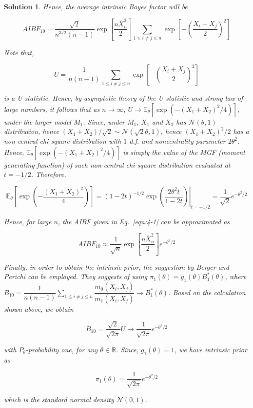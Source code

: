 \documentclass[12pt]{article}
\theoremstyle{problemstyle}
\newtheorem*{solution*}{Solution}
\newcommand{\E}{\mathbb{E}}
\newcommand{\normal}{\mathcal{N}}
\newcommand{\R}{\mathbb{R}}
\begin{document}
\begin{solution*}
    Hence, the average intrinsic Bayes factor will be

    \begin{equation}
        AIBF_{10} = \dfrac{\sqrt{2}}{n^{3/2}(n-1)} \exp\left[ \dfrac{n\overline{X}_n^2}{2} \right] \sum_{1 \leq i \neq j \leq n} \exp\left[ -\left(\dfrac{X_i + X_j}{2}\right)^2 \right]
        \label{eqn:4-1}        
    \end{equation}

    Note that, 

    $$
    U = \dfrac{1}{n(n-1)} \sum_{1 \leq i \neq j \leq n} \exp\left[ -\left(\dfrac{X_i + X_j}{2}\right)^2 \right]
    $$

    is a U-statistic. Hence, by asymptotic theory of the U-statistic and strong law of large numbers, it follows that as $n \rightarrow \infty$, $U \rightarrow \E_{\theta}\left[ \exp\left( -(X_1 + X_2)^2/4 \right) \right]$, under the larger model $M_1$. Since, under $M_1$, $X_1$ and $X_2$ has $\normal(\theta, 1)$ distribution, hence $(X_1 + X_2)/\sqrt{2} \sim \normal(\sqrt{2}\theta, 1)$, hence $(X_1 + X_2)^2/2$ has a non-central chi-square distribution with $1$ d.f. and noncentrality parameter $2\theta^2$. Hence, $\E_{\theta}\left[ \exp\left( -(X_1 + X_2)^2/4 \right) \right]$ is simply the value of the MGF (moment generating function) of such non-central chi-square distribution evaluated at $t = -1/2$. Therefore,

    $$
    \E_{\theta}\left[ \exp\left( -\dfrac{(X_1 + X_2)^2}{4} \right) \right] = \left. (1-2t)^{-1/2} \exp\left( \dfrac{2\theta^2 t}{1-2t} \right) \right\vert_{t = -1/2} = \dfrac{1}{\sqrt{2}} e^{-\theta^2/2}
    $$

    Hence, for large $n$, the AIBF given in Eq.~\eqref{eqn:4-1} can be approximated as 

    $$
    AIBF_{10} \approx \dfrac{1}{\sqrt{n}} \exp\left[ \dfrac{n\overline{X}_n^2}{2} \right] e^{-\theta^2/2}
    $$


    Finally, in order to obtain the intrinsic prior, the suggestion by Berger and Perichi can be employed. They suggests of using $\pi_1(\theta) = g_1(\theta) B_1^\ast(\theta)$, where $\overline{B}_{10} = \dfrac{1}{n(n-1)} \sum_{1 \leq i \neq j \leq n} \dfrac{m_0(X_i, X_j)}{m_1(X_i, X_j)} \rightarrow B_1^\ast(\theta)$. Based on the calculation shown above, we obtain 

    $$
    \overline{B}_{10} = \dfrac{\sqrt{2}}{\sqrt{2\pi}} U \rightarrow \dfrac{1}{\sqrt{2\pi}} e^{-\theta^2/2}
    $$

    with $P_\theta$-probability one, for any $\theta \in \R$. Since, $g_1(\theta) = 1$, we have intrinsic prior as 

    $$
    \pi_1(\theta) = \dfrac{1}{\sqrt{2\pi}} e^{-\theta^2/2}
    $$

    which is the standard normal density $\normal(0, 1)$.

\end{solution*}
\pagebreak
\end{document}
